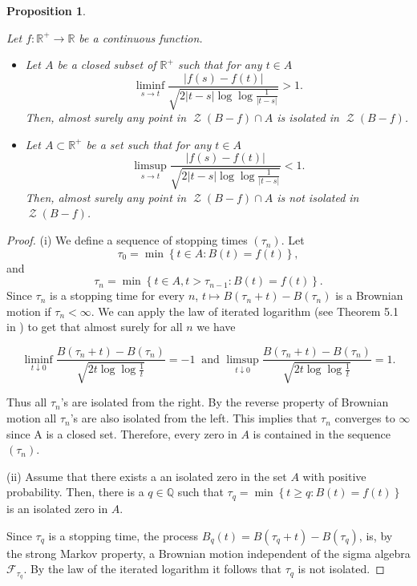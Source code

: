 \documentclass[11pt,reqno]{amsart}
\theoremstyle{plain}
\newtheorem{proposition}[theorem]{Proposition}
\theoremstyle{definition}
\theoremstyle{remark}
\begin{document}
\begin{proposition}\label{prop:basic_facts2}

Let $f \colon \mathbb{R}^+ \to \mathbb{R}$ be a continuous function.

\begin{itemize}

\item[(i)]

Let $A$ be a closed subset of $\mathbb{R}^+$ such that for any $t \in A$
\[\liminf_{s \to t}\frac{|f(s)-f(t)|}{\sqrt{2|t-s|\log\log{\frac{1}{|t-s|}}}} > 1. \]
Then, almost surely any point in $\operatorname{\mathcal{Z}}(B-f) \cap A$ is isolated in $\operatorname{\mathcal{Z}}(B-f)$.

\item[(ii)]

Let $A \subset \mathbb{R}^+$ be a set such that for any $t \in A$
\[\limsup_{s \to t}\frac{|f(s)-f(t)|}{\sqrt{2|t-s|\log\log{\frac{1}{|t-s|}}}} < 1. \]
Then, almost surely any point in $\operatorname{\mathcal{Z}}(B-f) \cap A$ is not isolated in $\operatorname{\mathcal{Z}}(B-f)$.

\end{itemize}

\end{proposition}

\begin{proof}
(i)
We define a sequence of stopping times $(\tau_n)$. Let $$\tau_0 = \min\left\{ t\in A : B(t)=f(t)\right\},$$ and $$\tau_n = \min\left\{ t\in A, t> \tau_{n-1}: B(t)=f(t)\right\}.$$
Since $\tau_n$ is a stopping time for every $n$, $t \mapsto B(\tau_n+t)-B(\tau_n)$ is a Brownian motion if $\tau_n < \infty$. We can apply the law of iterated logarithm (see Theorem 5.1 in \cite{MP}) to get that almost surely for all $n$ we have

\[
\liminf_{t \downarrow 0}\frac{B(\tau_n+t)-B(\tau_n)}{\sqrt{2t\log\log{\frac{1}{t}}}} = - 1 \ \text{ and } \limsup_{t \downarrow 0}\frac{B(\tau_n+t)-B(\tau_n)}{\sqrt{2t\log\log{\frac{1}{t}}}} = 1.
\]

Thus all $\tau_n$'s are isolated from the right. By the reverse property of Brownian motion all $\tau_n$'s are also isolated from the left. This implies that $\tau_n$ converges to $\infty$ since A is a closed set. Therefore, every zero in $A$ is contained in the sequence $(\tau_n)$.

(ii) Assume that there exists a an isolated zero in the set $A$ with positive probability. Then, there is a $q \in \mathbb{Q}$ such that $\tau_q = \min\left\{ t\geq q : B(t)=f(t)\right\}$ is an isolated zero in $A$. 

Since $\tau_q$ is a stopping time, the process $B_q(t)=B(\tau_q+t)-B(\tau_q)$, is, by the strong Markov property, a Brownian motion independent of the sigma algebra $\mathcal{F}_{\tau_q}$. By the law of the iterated logarithm it follows that $\tau_q$ is not isolated.

\end{proof}
\end{document}
